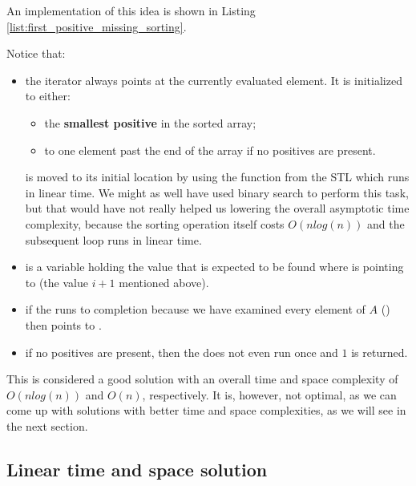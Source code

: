 An implementation of this idea is shown in Listing
\ref{list:first_positive_missing_sorting}.



Notice that:
\begin{itemize}
	\item the iterator  always points at the currently evaluated element. 
	It is initialized to either:
	\begin{itemize}
		\item the \textbf{smallest positive} in the sorted array;
		\item to one element past the end of the array if no positives are present.
	\end{itemize}
	 is moved to its initial location by using the  function from the STL which runs in linear time. We might as well have used binary search to perform this task, but that would have not really helped us lowering the overall asymptotic time complexity, because the sorting operation itself costs $O(nlog(n))$ and the subsequent  loop runs in linear time. 
	\item {} is a variable holding the value that is expected to be found where  is pointing to (the value $i+1$ mentioned above).
	\item if the  runs to completion because we have examined every element of $A$ () then  points to .
	\item if no positives are present, then the  does not even run once and $1$ is returned.
\end{itemize}

This is considered a good solution with an overall time and space complexity of $O(nlog(n))$ and $O(n)$, respectively. It is, however, not optimal, as we can come up with solutions with better time and space complexities, as we will see in the next section. 


\subsection{Linear time and space solution}
\label{first_positive_missing:sec:linear_space}

